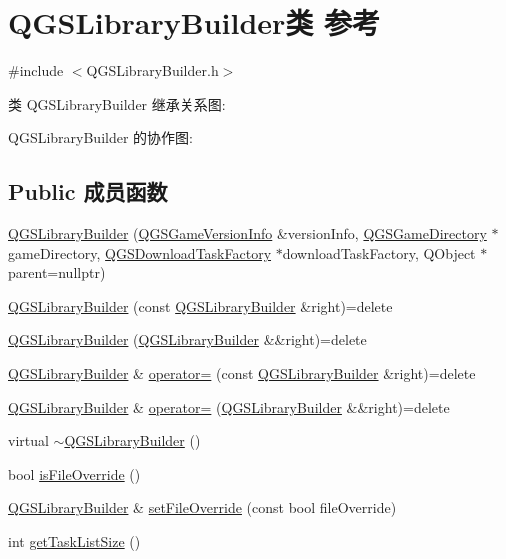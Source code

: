 \hypertarget{class_q_g_s_library_builder}{}\section{Q\+G\+S\+Library\+Builder类 参考}
\label{class_q_g_s_library_builder}


{\ttfamily \#include $<$Q\+G\+S\+Library\+Builder.\+h$>$}



类 Q\+G\+S\+Library\+Builder 继承关系图\+:


Q\+G\+S\+Library\+Builder 的协作图\+:
\subsection*{Public 成员函数}
\begin{DoxyCompactItemize}
\item 
\mbox{\hyperlink{class_q_g_s_library_builder_a3c397317f0d2a4c70b224fc2df8b0323}{Q\+G\+S\+Library\+Builder}} (\mbox{\hyperlink{class_q_g_s_game_version_info}{Q\+G\+S\+Game\+Version\+Info}} \&version\+Info, \mbox{\hyperlink{class_q_g_s_game_directory}{Q\+G\+S\+Game\+Directory}} $\ast$game\+Directory, \mbox{\hyperlink{class_q_g_s_download_task_factory}{Q\+G\+S\+Download\+Task\+Factory}} $\ast$download\+Task\+Factory, Q\+Object $\ast$parent=nullptr)
\item 
\mbox{\hyperlink{class_q_g_s_library_builder_aa076b1b7bfd76fb385b772b508a3ad20}{Q\+G\+S\+Library\+Builder}} (const \mbox{\hyperlink{class_q_g_s_library_builder}{Q\+G\+S\+Library\+Builder}} \&right)=delete
\item 
\mbox{\hyperlink{class_q_g_s_library_builder_a4bb3d86279bf906be2ad98576649741e}{Q\+G\+S\+Library\+Builder}} (\mbox{\hyperlink{class_q_g_s_library_builder}{Q\+G\+S\+Library\+Builder}} \&\&right)=delete
\item 
\mbox{\hyperlink{class_q_g_s_library_builder}{Q\+G\+S\+Library\+Builder}} \& \mbox{\hyperlink{class_q_g_s_library_builder_aa4dbd885db597c11f2bcfae7fa934ec7}{operator=}} (const \mbox{\hyperlink{class_q_g_s_library_builder}{Q\+G\+S\+Library\+Builder}} \&right)=delete
\item 
\mbox{\hyperlink{class_q_g_s_library_builder}{Q\+G\+S\+Library\+Builder}} \& \mbox{\hyperlink{class_q_g_s_library_builder_a14048ca986d1a6444882b1c9e10eceea}{operator=}} (\mbox{\hyperlink{class_q_g_s_library_builder}{Q\+G\+S\+Library\+Builder}} \&\&right)=delete
\item 
virtual \mbox{\hyperlink{class_q_g_s_library_builder_aca05cf3de85fa87e3089202281f8e660}{$\sim$\+Q\+G\+S\+Library\+Builder}} ()
\item 
bool \mbox{\hyperlink{class_q_g_s_library_builder_a6f4b8a6ed808d30b3ca18553b7fc134c}{is\+File\+Override}} ()
\item 
\mbox{\hyperlink{class_q_g_s_library_builder}{Q\+G\+S\+Library\+Builder}} \& \mbox{\hyperlink{class_q_g_s_library_builder_a752a429b619cd207f898c3ec331d922f}{set\+File\+Override}} (const bool file\+Override)
\item 
int \mbox{\hyperlink{class_q_g_s_library_builder_aca3f3dc225dd0a69500af0d685e51ed9}{get\+Task\+List\+Size}} ()
\end{DoxyCompactItemize}
